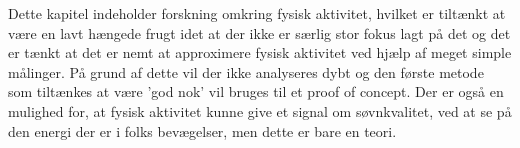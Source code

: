 Dette kapitel indeholder forskning omkring fysisk aktivitet, hvilket er tiltænkt at være en lavt hængede frugt idet at der ikke er særlig stor fokus lagt på det og det er tænkt at det er nemt at approximere fysisk aktivitet ved hjælp af meget simple målinger.
På grund af dette vil der ikke analyseres dybt og den første metode som tiltænkes at være 'god nok' vil bruges til et proof of concept.
Der er også en mulighed for, at fysisk aktivitet kunne give et signal om søvnkvalitet, ved at se på den energi der er i folks bevægelser, men dette er bare en teori.